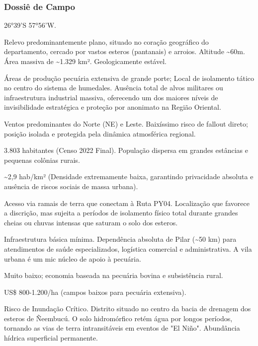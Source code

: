 \subsubsection{Dossiê de Campo}
\begin{description}[style=nextline,leftmargin=0.5cm,font=\bfseries]
\item[Coordenadas]  26°39'S 57°56'W.
\item[Topografia]  Relevo predominantemente plano, situado no coração geográfico do departamento, cercado por vastos esteros (pantanais) e arroios. Altitude \textasciitilde 60m. Área massiva de \textasciitilde 1.329 km². Geologicamente estável.
\item[Alvos Estratégicos]  Áreas de produção pecuária extensiva de grande porte; Local de isolamento tático no centro do sistema de humedales. Ausência total de alvos militares ou infraestrutura industrial massiva, oferecendo um dos maiores níveis de invisibilidade estratégica e proteção por anonimato na Região Oriental.
\item[Fallout]  Ventos predominantes do Norte (NE) e Leste. Baixíssimo risco de fallout direto; posição isolada e protegida pela dinâmica atmosférica regional.
\item[População]  3.803 habitantes (Censo 2022 Final). População dispersa em grandes estâncias e pequenas colônias rurais.
\item[Densidade]  \textasciitilde 2,9 hab/\allowbreak km² (Densidade extremamente baixa, garantindo privacidade absoluta e ausência de riscos sociais de massa urbana).
\item[Vias de Acesso]  Acesso via ramais de terra que conectam à Ruta PY04. Localização que favorece a discrição, mas sujeita a períodos de isolamento físico total durante grandes cheias ou chuvas intensas que saturam o solo dos esteros.
\item[Serviços]  Infraestrutura básica mínima. Dependência absoluta de Pilar (\textasciitilde 50 km) para atendimentos de saúde especializados, logística comercial e administrativa. A vila urbana é um mic núcleo de apoio à pecuária.
\item[Custo de Vida]  Muito baixo; economia baseada na pecuária bovina e subsistência rural.
\item[Preço da Terra]  US\$ 800-1.200/\allowbreak ha (campos baixos para pecuária extensiva).
\item[Hidrologia]  Risco de Inundação Crítico. Distrito situado no centro da bacia de drenagem dos esteros de Ñeembucú. O solo hidromórfico retém água por longos períodos, tornando as vias de terra intransitáveis em eventos de "El Niño". Abundância hídrica superficial permanente.

\end{description}
